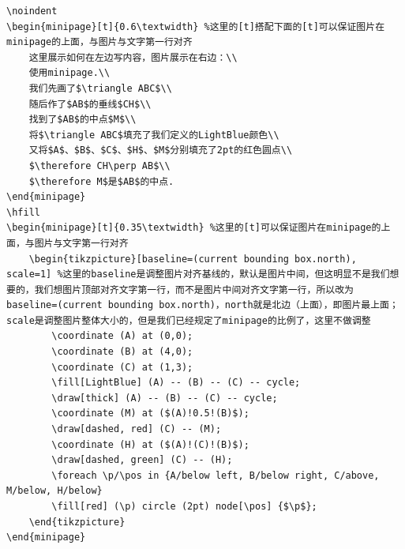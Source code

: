 \documentclass{article}
\begin{document}
\begin{lstlisting}
\noindent
\begin{minipage}[t]{0.6\textwidth} %这里的[t]搭配下面的[t]可以保证图片在minipage的上面，与图片与文字第一行对齐
	这里展示如何在左边写内容，图片展示在右边：\\
	使用minipage.\\
	我们先画了$\triangle ABC$\\
	随后作了$AB$的垂线$CH$\\
	找到了$AB$的中点$M$\\
	将$\triangle ABC$填充了我们定义的LightBlue颜色\\
	又将$A$、$B$、$C$、$H$、$M$分别填充了2pt的红色圆点\\
	$\therefore CH\perp AB$\\
	$\therefore M$是$AB$的中点.
\end{minipage}
\hfill
\begin{minipage}[t]{0.35\textwidth} %这里的[t]可以保证图片在minipage的上面，与图片与文字第一行对齐
	\begin{tikzpicture}[baseline=(current bounding box.north), scale=1] %这里的baseline是调整图片对齐基线的，默认是图片中间，但这明显不是我们想要的，我们想图片顶部对齐文字第一行，而不是图片中间对齐文字第一行，所以改为baseline=(current bounding box.north)，north就是北边（上面），即图片最上面；scale是调整图片整体大小的，但是我们已经规定了minipage的比例了，这里不做调整
		\coordinate (A) at (0,0);
		\coordinate (B) at (4,0);
		\coordinate (C) at (1,3);
		\fill[LightBlue] (A) -- (B) -- (C) -- cycle;
		\draw[thick] (A) -- (B) -- (C) -- cycle;
		\coordinate (M) at ($(A)!0.5!(B)$);
		\draw[dashed, red] (C) -- (M);
		\coordinate (H) at ($(A)!(C)!(B)$);
		\draw[dashed, green] (C) -- (H);
		\foreach \p/\pos in {A/below left, B/below right, C/above, M/below, H/below}
		\fill[red] (\p) circle (2pt) node[\pos] {$\p$};
	\end{tikzpicture}
\end{minipage}
\end{lstlisting}
\end{document}
